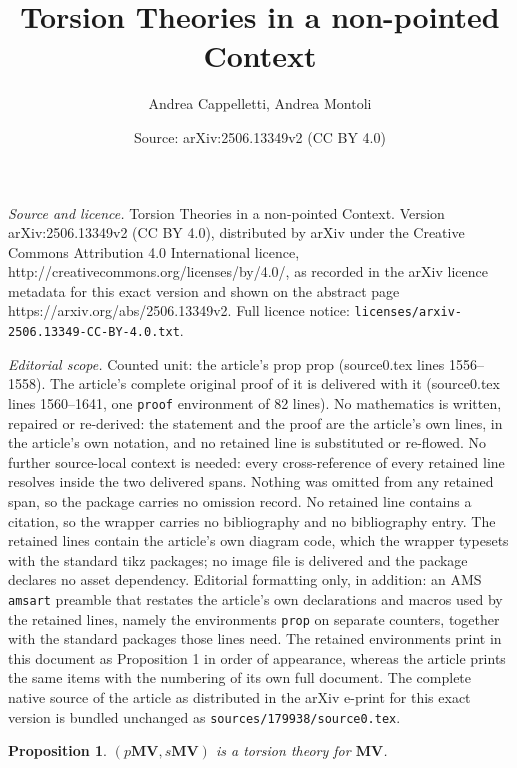 \documentclass[10pt,a4paper]{amsart}
\title{Torsion Theories in a non-pointed Context}
\author{Andrea Cappelletti, Andrea Montoli}
\date{Source: arXiv:2506.13349v2 (CC BY 4.0)}
\newtheorem{prop}{Proposition}
\newcommand{\mv}{\mathbf{MV}}
\begin{document}
\maketitle

\noindent\emph{Source and licence.} Torsion Theories in a non-pointed Context. Version arXiv:2506.13349v2 (CC BY 4.0), distributed by arXiv under the Creative Commons Attribution 4.0 International licence, http://creativecommons.org/licenses/by/4.0/, as recorded in the arXiv licence metadata for this exact version and shown on the abstract page https://arxiv.org/abs/2506.13349v2. Full licence notice: \texttt{licenses/arxiv-2506.13349-CC-BY-4.0.txt}.\par\smallskip

\noindent\textit{Editorial scope.} Counted unit: the article's prop prop (source0.tex lines 1556--1558). The article's complete original proof of it is delivered with it (source0.tex lines 1560--1641, one \texttt{proof} environment of 82 lines). No mathematics is written, repaired or re-derived: the statement and the proof are the article's own lines, in the article's own notation, and no retained line is substituted or re-flowed.  No further source-local context is needed: every cross-reference of every retained line resolves inside the two delivered spans.  Nothing was omitted from any retained span, so the package carries no omission record.  No retained line contains a citation, so the wrapper carries no bibliography and no bibliography entry.  The retained lines contain the article's own diagram code, which the wrapper typesets with the standard tikz packages; no image file is delivered and the package declares no asset dependency.  Editorial formatting only, in addition: an AMS \texttt{amsart} preamble that restates the article's own declarations and macros used by the retained lines, namely the environments \texttt{prop} on separate counters, together with the standard packages those lines need.  The retained environments print in this document as Proposition 1 in order of appearance, whereas the article prints the same items with the numbering of its own full document.  The complete native source of the article as distributed in the arXiv e-print for this exact version is bundled unchanged as \texttt{sources/179938/source0.tex}.
		\begin{prop}
			$(p\mv,s\mv)$ is a torsion theory for $\mv$.
		\end{prop}
\end{document}
